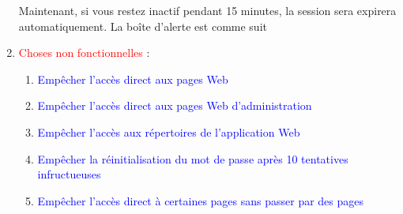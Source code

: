 \documentclass{article}
\begin{document}
\begin{enumerate}
               
    \vspace{4cm}           
               Maintenant, si vous restez inactif pendant 15 minutes, la session sera expirera automatiquement. La boîte d'alerte est comme suit
  
 \vspace{0.7cm}
               \hspace*{-0.7in}
               \noindent{}  
  
  
  
  
  
  
	\vspace{3cm}
 \item \textcolor{red}{\huge Choses non fonctionnelles} :  
   \vspace{0.7cm}
        
        \begin{enumerate}
        \item\textcolor{blue}{Empêcher l'accès direct aux pages Web}
        \item\textcolor{blue}{Empêcher l'accès direct aux pages Web d'administration}
        \item\textcolor{blue}{Empêcher l'accès aux répertoires de l'application Web}
        \item\textcolor{blue}{Empêcher la réinitialisation du mot de passe après 10 tentatives infructueuses}
        \item\textcolor{blue}{Empêcher l'accès direct à certaines pages sans passer par des pages}
        
        
        \end{enumerate} 
  

\end{enumerate}
\end{document}

